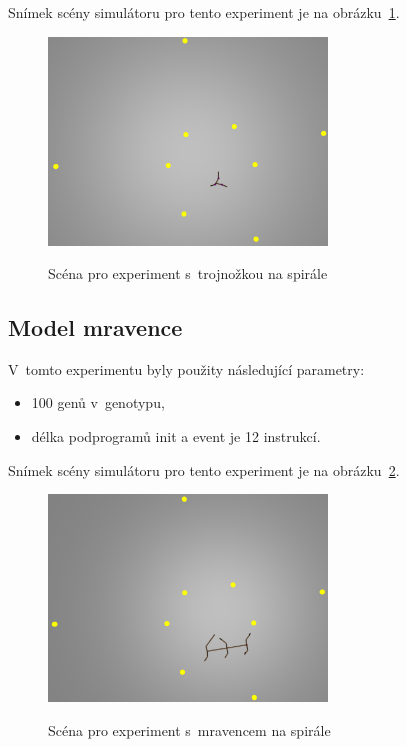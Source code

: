 Snímek scény simulátoru pro tento experiment je na obrázku~\ref{fig:trojnozka_spirala_zhora}.
\begin{figure}[h]
    \centering
    {\includegraphics[width=20em]{obrazky/trojnozka_spirala_zhora.png}}
    \caption{
    Scéna pro experiment s~trojnožkou na spirále
    }
    \label{fig:trojnozka_spirala_zhora}
\end{figure}

\subsection{Model mravence}

V~tomto experimentu byly použity následující parametry:
\begin{itemize}
    \item 100 genů v~genotypu,
    \item délka podprogramů init a event je 12 instrukcí.
\end{itemize}

Snímek scény simulátoru pro tento experiment je na obrázku~\ref{fig:mravenec_spirala_zhora}.
\begin{figure}[h]
    \centering
    {\includegraphics[width=20em]{obrazky/mravenec_spirala_zhora.png}}
    \caption{
    Scéna pro experiment s~mravencem na spirále
    }
    \label{fig:mravenec_spirala_zhora}
\end{figure}


